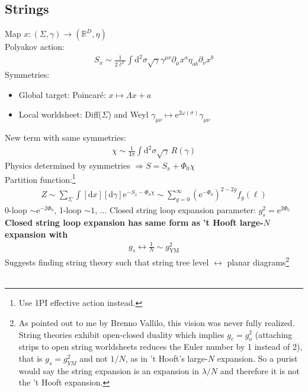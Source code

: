 \documentclass[12pt]{article}
\begin{document}
\subsection{Strings}
Map $x:(\Sigma, \gamma) \to (\mathbb R^D, \eta)$\\
Polyakov action: 
\begin{eqnarray}
S_x\sim \frac1{2\ell^2} \int \mathrm d^2\sigma \sqrt{\gamma} \gamma^{\mu\nu} \partial_\mu x^a \eta_{ab} \partial_\nu x^b
\end{eqnarray}
Symmetries: 
\begin{itemize}
\item Global target: Poincar\'e: $x \mapsto \Lambda x + a$
\item Local worldsheet: Diff($\Sigma$) and Weyl $\gamma_{\mu \nu}\mapsto \mathrm e^{2\omega(\sigma)} 
\gamma_{\mu \nu}$
\end{itemize}
New term with same symmetries:
\begin{eqnarray}
\chi \sim \frac1{4\pi} \int \mathrm d^2\sigma \sqrt{\gamma}\,R(\gamma)
\end{eqnarray}
Physics determined by symmetries $\Rightarrow S=S_x+\Phi_0 \chi$\\
Partition function:\footnote{Use 1PI effective action instead.}
\begin{eqnarray}
Z\sim \sum_{\Sigma} \int [\mathrm d x] [\mathrm d \gamma] \mathrm e^{-S_x - \Phi_0 \chi}
\sim \sum_{g=0}^\infty (\mathrm e^{-\Phi_0})^{2-2g} f_g(\ell)
\end{eqnarray}
0-loop $\sim \mathrm e^{-2 \Phi_0}$, 1-loop $\sim 1$, ... Closed string loop expansion parameter: $g^2_s=\mathrm e^{2\Phi_0}$\\
{\bf Closed string loop expansion has same form as 't Hooft large-$N$ expansion with}
\begin{eqnarray}
g_s \leftrightarrow \frac 1N \sim g_\mathrm{YM}^2
\end{eqnarray}
Suggests finding string theory such that string tree level $\leftrightarrow$ planar diagrams\footnote{As pointed out to me by Brenno Vallilo, this vision was never fully realized. String theories exhibit open-closed duality which implies $g_c = g_o^2$ (attaching strips to open string worldsheets reduces the Euler number by 1 instead of 2), that is $g_s = g_{YM}^2$ and not $1/N$, as in 't Hooft's large-$N$ expansion. So a purist would say the string expansion is an expansion in $\lambda/N$ and therefore it is not the 't Hooft expansion.}\\
\\
\end{document}
